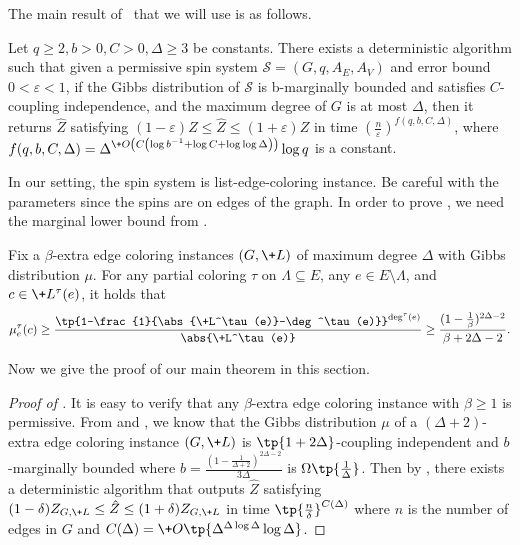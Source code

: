 \documentclass[a4paper,11pt]{article}
\begin{document}
The main result of~\cite{CFGZZ24} that we will use is as follows.
\begin{theorem}\label{thm:ci-FPTAS}
    Let $q \geq 2, b>0, C>0, \Delta \geq 3$ be constants. There exists a deterministic algorithm such that given a permissive spin system $\mathcal{S}=\left(G, q, A_E, A_V\right)$ and error bound $0<\varepsilon<1$, if the Gibbs distribution of $\mathcal{S}$ is b-marginally bounded and satisfies $C$-coupling independence, and the maximum degree of $G$ is at most $\Delta$, then it returns $\hat{Z}$ satisfying $(1-\varepsilon) Z \leq \hat{Z} \leq(1+\varepsilon) Z$ in time $\left(\frac{n}{\varepsilon}\right)^{f(q, b, C, \Delta)}$, where $f(q, b, C, \Delta)=\Delta^{\+O\left(C\left(\log b^{-1}+\log C+\log \log \Delta\right)\right)} \log q$ is a constant.
\end{theorem}
In our setting, the spin system is list-edge-coloring instance. Be careful with the parameters since the spins are on edges of the graph. In order to prove , we need the marginal lower bound from \cite{GKM15}.
\begin{lemma} \label{lem:marginal-bound-gkm}
Fix a $\beta$-extra edge coloring instances $(G,\+L)$ of maximum degree $\Delta$ with Gibbs distribution $\mu$. For any partial coloring $\tau$ on $\Lambda \subseteq E$, any $e \in E\setminus \Lambda$, and $c \in \+L^\tau(e)$, it holds that
	\[
		\mu^{\tau}_e(c) \geq \frac{\tp{1-\frac{1}{\abs{\+L^\tau(e)}-\deg^\tau(e)}}^{\deg^\tau(e)}}{\abs{\+L^\tau(e)}}\ge \frac{(1-\frac{1}{\beta})^{2\Delta-2}}{\beta+2\Delta-2} .
	\]
 \end{lemma}
Now we give the proof of our main theorem in this section.
\begin{proof}[Proof of ]
It is easy to verify that any $\beta$-extra edge coloring instance with $\beta \geq 1$ is permissive. From  and , we know that the Gibbs distribution $\mu$ of a $(\Delta + 2)$-extra edge coloring instance $(G,\+L)$ is $\tp{1+ 2\Delta}$-coupling independent and $b$-marginally bounded where $b=\frac{(1-\frac{1}{\Delta + 2})^{2\Delta-2}}{3\Delta}$ is $\Omega\tp{\frac{1}{\Delta}}$. Then by , there exists a deterministic algorithm that outputs $\hat{Z}$ satisfying $(1-\delta)Z_{G,\+L}\leq \hat{Z}\leq (1+\delta)Z_{G,\+L}$ in time $\tp{\frac{n}{\delta}}^{C(\Delta)}$ where $n$ is the number of edges in $G$ and $C(\Delta)=\+O\tp{\Delta^{\Delta\log \Delta}\log \Delta}$.
\end{proof}
\end{document}
